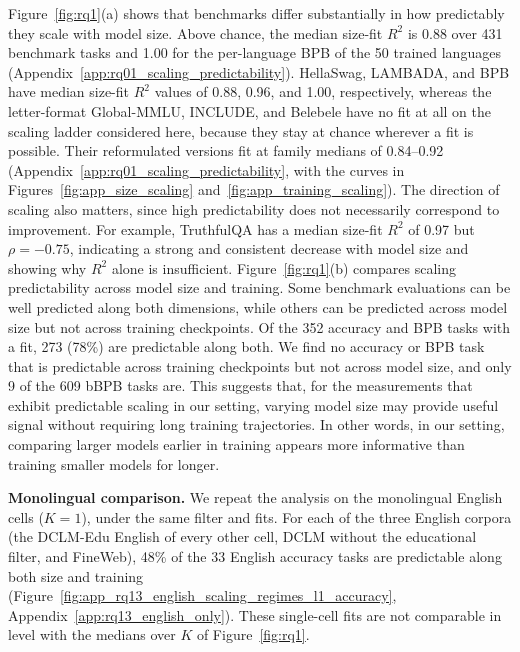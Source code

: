Figure~\ref{fig:rq1}(a) shows that benchmarks differ substantially in how predictably they scale with model size. Above chance, the median size-fit $R^2$ is 0.88 over 431 benchmark tasks and 1.00 for the per-language BPB of the 50 trained languages (Appendix~\ref{app:rq01_scaling_predictability}). HellaSwag, LAMBADA, and BPB have median size-fit $R^2$ values of 0.88, 0.96, and 1.00, respectively, whereas the letter-format Global-MMLU, INCLUDE, and Belebele have no fit at all on the scaling ladder considered here, because they stay at chance wherever a fit is possible. Their reformulated versions fit at family medians of 0.84--0.92 (Appendix~\ref{app:rq01_scaling_predictability}, with the curves in Figures~\ref{fig:app_size_scaling} and~\ref{fig:app_training_scaling}). The direction of scaling also matters, since high predictability does not necessarily correspond to improvement. For example, TruthfulQA has a median size-fit $R^2$ of 0.97 but $\rho=-0.75$, indicating a strong and consistent decrease with model size and showing why $R^2$ alone is insufficient.
Figure~\ref{fig:rq1}(b) compares scaling predictability across model size and training. Some benchmark evaluations can be well predicted along both dimensions, while others can be predicted across model size but not across training checkpoints. Of the 352 accuracy and BPB tasks with a fit, 273 (78\%) are predictable along both. We find no accuracy or BPB task that is predictable across training checkpoints but not across model size, and only 9 of the 609 bBPB tasks are.
This suggests that, for the measurements that exhibit predictable scaling in our setting, varying model size may provide useful signal without requiring long training trajectories.
In other words, in our setting, comparing larger models earlier in training appears more informative than training smaller models for longer.

\textbf{Monolingual comparison.} We repeat the analysis on the monolingual English cells ($K = 1$), under the same filter and fits. For each of the three English corpora (the DCLM-Edu English of every other cell, DCLM without the educational filter, and FineWeb), 48\% of the 33 English accuracy tasks are predictable along both size and training (Figure~\ref{fig:app_rq13_english_scaling_regimes_l1_accuracy}, Appendix~\ref{app:rq13_english_only}). These single-cell fits are not comparable in level with the medians over $K$ of Figure~\ref{fig:rq1}.

